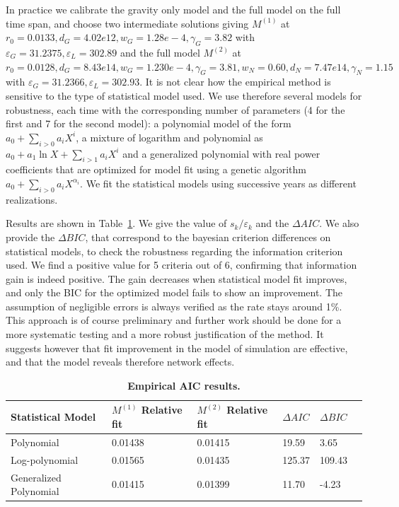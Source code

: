\documentclass[Royal,sageh,times]{sagej}
\begin{document}
In practice we calibrate the gravity only model and the full model on the full time span, and choose two intermediate solutions giving $M^{(1)}$ at $r_0=0.0133, d_G = 4.02e12, w_G = 1.28e-4, \gamma_G = 3.82$ with $\varepsilon_G=31.2375,\varepsilon_L=302.89$ and the full model $M^{(2)}$ at $r_0=0.0128, d_G = 8.43e14, w_G = 1.230e-4, \gamma_G = 3.81, w_N=0.60, d_N=7.47e14, \gamma_N = 1.15$ with $\varepsilon_G=31.2366,\varepsilon_L=302.93$. It is not clear how the empirical method is sensitive to the type of statistical model used. We use therefore several models for robustness, each time with the corresponding number of parameters (4 for the first and 7 for the second model): a polynomial model of the form $a_0 + \sum_{i>0} a_i X^i$, a mixture of logarithm and polynomial as $a_0 + a_1 \ln X + \sum_{i>1} a_i X^i$ and a generalized polynomial with real power coefficients that are optimized for model fit using a genetic algorithm $a_0 + \sum_{i>0} a_i X^{\alpha_i}$. We fit the statistical models using successive years as different realizations.

Results  are shown in Table~\ref{tab:empiricalaic}. We give the value of $s_k / \varepsilon_k$ and the $\Delta AIC$. We also provide the $\Delta BIC$, that correspond to the bayesian criterion differences on statistical models, to check the robustness regarding the information criterion used. We find a positive value for 5 criteria out of 6, confirming that information gain is indeed positive. The gain decreases when statistical model fit improves, and only the BIC for the optimized model fails to show an improvement. The assumption of negligible errors is always verified as the rate stays around 1\%. This approach is of course preliminary and further work should be done for a more systematic testing and a more robust justification of the method. It suggests however that fit improvement in the model of simulation are effective, and that the model reveals therefore network effects.


\begin{table}[ht]
\small\sf\centering
\caption{\textbf{Empirical AIC results.}}\label{tab:empiricalaic}
\begin{tabular}{|l|l|l|l|l|l}
\toprule
Statistical Model & $M^{(1)}$ Relative fit & $M^{(2)}$ Relative fit & $\Delta AIC$ & $\Delta BIC$\\
\midrule
Polynomial & 0.01438 & 0.01415 & 19.59 & 3.65\\
Log-polynomial & 0.01565  & 0.01435 & 125.37 & 109.43\\
Generalized Polynomial & 0.01415  & 0.01399 & 11.70 & -4.23\\
\bottomrule
\end{tabular}
\end{table}
\end{document}
